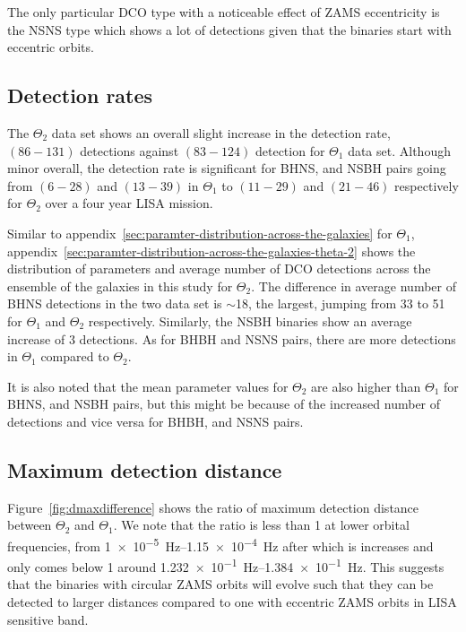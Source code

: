 \documentclass[journal, twocolumns]{IEEEtran}
\begin{document}
    The only particular DCO type with a noticeable effect of ZAMS eccentricity is the NSNS type which shows a lot of detections given that the binaries start with eccentric orbits.

    \subsection{Detection rates}
    \label{subsec:detectionetection-rates}
    The $\Theta_2$ data set shows an overall slight increase in the detection rate, $(86-131)$ detections against $(83-124)$ detection for $\Theta_1$ data set.
    Although minor overall, the detection rate is significant for BHNS, and NSBH pairs going from $(6-28)$ and $(13-39)$ in $\Theta_1$ to $(11-29)$ and $(21-46)$ respectively for $\Theta_2$ over a four year LISA mission.

    Similar to appendix~\ref{sec:paramter-distribution-across-the-galaxies} for $\Theta_1$, appendix~\ref{sec:paramter-distribution-across-the-galaxies-theta-2} shows the distribution of parameters and average number of DCO detections across the ensemble of the galaxies in this study for $\Theta_2$.
    The difference in average number of BHNS detections in the two data set is $\sim$18, the largest, jumping from 33 to 51 for $\Theta_1$ and $\Theta_2$ respectively.
    Similarly, the NSBH binaries show an average increase of 3 detections.
    As for BHBH and NSNS pairs, there are more detections in $\Theta_1$ compared to $\Theta_2$.

    It is also noted that the mean parameter values for $\Theta_2$ are also higher than $\Theta_1$ for BHNS, and NSBH pairs, but this might be because of the increased number of detections and vice versa for BHBH, and NSNS pairs.

    \subsection{Maximum detection distance}
    \label{subsec:maximumdetectiondistance}
    Figure~\ref{fig:dmaxdifference} shows the ratio of maximum detection distance between $\Theta_2$ and $\Theta_1$.
    We note that the ratio is less than 1 at lower orbital frequencies, from \SIrange{1e-5}{1.15e-4}{\hertz} after which is increases and only comes below 1 around \SIrange{1.232e-1}{1.384e-1}{\hertz}.
    This suggests that the binaries with circular ZAMS orbits will evolve such that they can be detected to larger distances compared to one with eccentric ZAMS orbits in LISA sensitive band.
\end{document}
